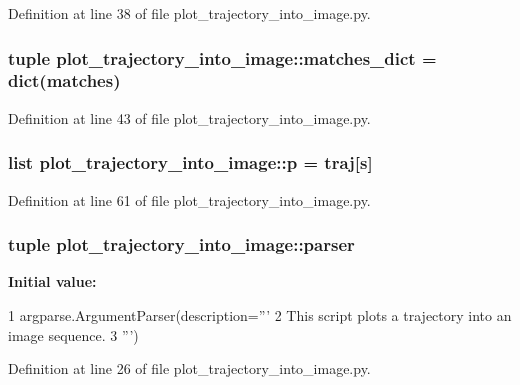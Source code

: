 \-Definition at line 38 of file plot\-\_\-trajectory\-\_\-into\-\_\-image.\-py.

\subsubsection[{matches\-\_\-dict}]{\setlength{\rightskip}{0pt plus 5cm}tuple {\bf plot\-\_\-trajectory\-\_\-into\-\_\-image\-::matches\-\_\-dict} = dict({\bf matches})}\label{namespaceplot__trajectory__into__image_aca2bd79a7bfe5769e9005eeec74a9dd2}


\-Definition at line 43 of file plot\-\_\-trajectory\-\_\-into\-\_\-image.\-py.

\subsubsection[{p}]{\setlength{\rightskip}{0pt plus 5cm}list {\bf plot\-\_\-trajectory\-\_\-into\-\_\-image\-::p} = {\bf traj}[s]}\label{namespaceplot__trajectory__into__image_a84e5a099e8e2f7bcd4723af4db9a50b8}


\-Definition at line 61 of file plot\-\_\-trajectory\-\_\-into\-\_\-image.\-py.

\subsubsection[{parser}]{\setlength{\rightskip}{0pt plus 5cm}tuple {\bf plot\-\_\-trajectory\-\_\-into\-\_\-image\-::parser}}\label{namespaceplot__trajectory__into__image_ac2cbc20bab3da7c4d1942267ad33fda9}
{\bfseries \-Initial value\-:}
\begin{DoxyCode}
1 argparse.ArgumentParser(description='''
2     This script plots a trajectory into an image sequence. 
3     ''')
\end{DoxyCode}


\-Definition at line 26 of file plot\-\_\-trajectory\-\_\-into\-\_\-image.\-py.

